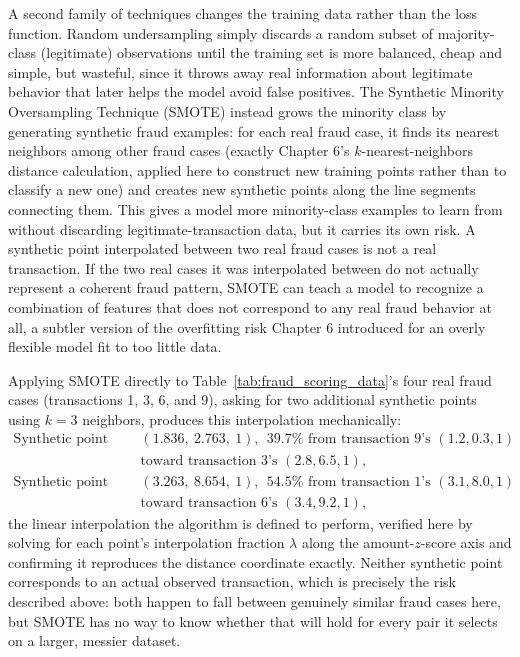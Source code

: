 \documentclass[../ai_in_finance]{subfiles}
\begin{document}
A second family of techniques changes the training data rather than the loss function. Random undersampling simply discards a random subset of majority-class (legitimate) observations until the training set is more balanced, cheap and simple, but wasteful, since it throws away real information about legitimate behavior that later helps the model avoid false positives. The Synthetic Minority Oversampling Technique (SMOTE) instead grows the minority class by generating synthetic fraud examples: for each real fraud case, it finds its nearest neighbors among other fraud cases (exactly Chapter 6's $k$-nearest-neighbors distance calculation, applied here to construct new training points rather than to classify a new one) and creates new synthetic points along the line segments connecting them. This gives a model more minority-class examples to learn from without discarding legitimate-transaction data, but it carries its own risk. A synthetic point interpolated between two real fraud cases is not a real transaction. If the two real cases it was interpolated between do not actually represent a coherent fraud pattern, SMOTE can teach a model to recognize a combination of features that does not correspond to any real fraud behavior at all, a subtler version of the overfitting risk Chapter 6 introduced for an overly flexible model fit to too little data.

Applying SMOTE directly to Table~\ref{tab:fraud_scoring_data}'s four real fraud cases (transactions 1, 3, 6, and 9), asking for two additional synthetic points using $k=3$ neighbors, produces this interpolation mechanically:
\begin{align*}
\text{Synthetic point 1:} &\quad (1.836,\ 2.763,\ 1), \ \ 39.7\% \text{ from transaction 9's } (1.2, 0.3, 1) \\
&\quad \text{toward transaction 3's } (2.8, 6.5, 1), \\
\text{Synthetic point 2:} &\quad (3.263,\ 8.654,\ 1), \ \ 54.5\% \text{ from transaction 1's } (3.1, 8.0, 1) \\
&\quad \text{toward transaction 6's } (3.4, 9.2, 1),
\end{align*}
the linear interpolation the algorithm is defined to perform, verified here by solving for each point's interpolation fraction $\lambda$ along the amount-$z$-score axis and confirming it reproduces the distance coordinate exactly. Neither synthetic point corresponds to an actual observed transaction, which is precisely the risk described above: both happen to fall between genuinely similar fraud cases here, but SMOTE has no way to know whether that will hold for every pair it selects on a larger, messier dataset.
\end{document}
